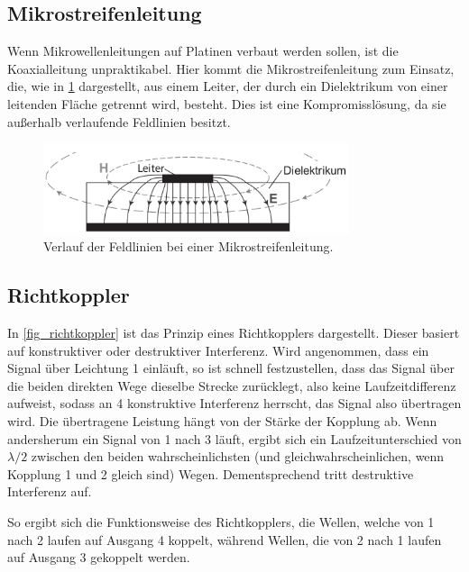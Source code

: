 \documentclass[
	a4paper,
	12pt,
	pagesize,
	ngerman
]{scrartcl}
\begin{document}
	\subsection{Mikrostreifenleitung}

	Wenn Mikrowellenleitungen auf Platinen verbaut werden sollen, ist die Koaxialleitung unpraktikabel.
	Hier kommt die Mikrostreifenleitung zum Einsatz, die, wie in \cref{fig_mikrostreifen} dargestellt, aus einem Leiter, der durch ein Dielektrikum von einer leitenden Fläche getrennt wird, besteht.
	Dies ist eine Kompromisslösung, da sie außerhalb verlaufende Feldlinien besitzt.

	\begin{figure}[H]
		\includegraphics[width=0.8\textwidth]{img/mirkostreifen}
		\centering
		\caption{
			Verlauf der Feldlinien bei einer Mikrostreifenleitung. \cite{Anleitung}
		}
		\label{fig_mikrostreifen}
		\centering
	\end{figure}


	\subsection{Richtkoppler}

	In \cref{fig_richtkoppler} ist das Prinzip eines Richtkopplers dargestellt.
	Dieser basiert auf konstruktiver oder destruktiver Interferenz.
	Wird angenommen, dass ein Signal über Leichtung 1 einläuft, so ist schnell festzustellen, dass das Signal über die beiden direkten Wege dieselbe Strecke zurücklegt, also keine Laufzeitdifferenz aufweist, sodass an 4 konstruktive Interferenz herrscht, das Signal also übertragen wird. %
	Die übertragene Leistung hängt von der Stärke der Kopplung ab.
	Wenn andersherum ein Signal von 1 nach 3 läuft, ergibt sich ein Laufzeitunterschied von $\lambda/2$ zwischen den beiden wahrscheinlichsten (und gleichwahrscheinlichen, wenn Kopplung 1 und 2 gleich sind) Wegen.
	Dementsprechend tritt destruktive Interferenz auf.

	So ergibt sich die Funktionsweise des Richtkopplers, die Wellen, welche von 1 nach 2 laufen auf Ausgang 4 koppelt, während Wellen, die von 2 nach 1 laufen auf Ausgang 3 gekoppelt werden.
\end{document}
